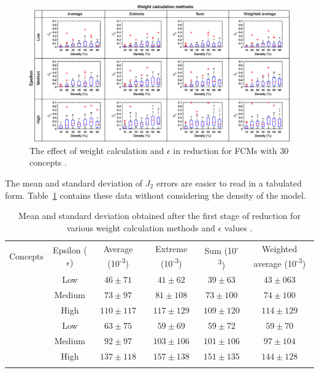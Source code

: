 \documentclass[graybox]{svmult}
\begin{document}
\begin{figure}[hbt]
  \includegraphics[width=\textwidth]{j2_unsup_c30.eps}
  \caption{The effect of weight calculation and $\epsilon$ in reduction 
  for FCMs with 30 concepts \cite{hatwagner2018two}.}
  \label{fig:epsilonWeightEffect30}
\end{figure}

The mean and standard deviation of $J_2$ errors are easier to read in 
a tabulated form. Table~\ref{tbl:meanStddevWeightEpsilon} contains 
these data without considering the density of the model.

\begin{table}[!t]
  \caption{Mean and standard deviation obtained after the first stage of reduction for various weight calculation methods and 
$\epsilon$ values \cite{hatwagner2018two}.}
  \label{tbl:meanStddevWeightEpsilon}
  \centering
  \begin{tabular}{cccccc}
    \hline\noalign{\smallskip}
    Concepts & Epsilon ($\epsilon$) & Average 
(10\textsuperscript{-3}) & Extreme (10\textsuperscript{-3}) & Sum 
(10\textsuperscript{-3}) & Weighted average 
(10\textsuperscript{-3}) \\
    \noalign{\smallskip}\svhline\noalign{\smallskip}
    \multirow{3}{*}{20} & Low & $46 \pm 71$ & $41 \pm 62$ & $39 \pm 63$ 
    & $43 \pm 063$ \\
    & Medium & $73 \pm 97$ & $81 \pm 108$ & $73 \pm 100$ & $74 \pm 100$ 
    \\
    & High & $110 \pm 117$ & $117 \pm 129$ & $109 \pm 120$ & $114 \pm 
    129$ \\
    \noalign{\smallskip}\hline\noalign{\smallskip}
    \multirow{3}{*}{30} & Low & $63 \pm 75$ & $59 \pm 69$ & $59 \pm 72$ 
    & $59 \pm 70$ \\
    & Medium & $92 \pm 97$ & $103 \pm 106$ & $101 \pm 106$ & $97 \pm 
    104$ \\
    & High & $137 \pm 118$ & $157 \pm 138$ & $151 \pm 135$ & $144 \pm 
    128$ \\
    \noalign{\smallskip}\hline\noalign{\smallskip}
  \end{tabular}
\end{table}
\end{document}

